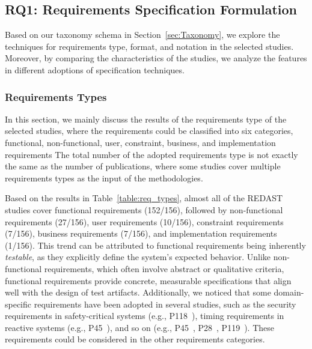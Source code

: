 \subsection{RQ1: Requirements Specification Formulation}
\label{sec:RQ1}
Based on our taxonomy schema in Section~\ref{sec:Taxonomy}, we explore the techniques for requirements type, format, and notation in the selected studies. Moreover, by comparing the characteristics of the studies, we analyze the features in different adoptions of specification techniques.

\subsubsection{Requirements Types}





In this section, we mainly discuss the results of the requirements type of the selected studies, where the requirements could be classified into six categories, functional, non-functional, user, constraint, business, and implementation requirements The total number of the adopted requirements type is not exactly the same as the number of publications, where some studies cover multiple requirements types as the input of the methodologies.

Based on the results in Table~\ref{table:req_types}, almost all of the REDAST studies cover functional requirements (152/156), followed by non-functional requirements (27/156), user requirements (10/156), constraint requirements (7/156), business requirements (7/156), and implementation requirements (1/156). This trend can be attributed to functional requirements being inherently \emph{testable}, as they explicitly define the system's expected behavior. Unlike non-functional requirements, which often involve abstract or qualitative criteria, functional requirements provide concrete, measurable specifications that align well with the design of test artifacts. Additionally, we noticed that some domain-specific requirements have been adopted in several studies, such as the security requirements in safety-critical systems (e.g., P118~), timing requirements in reactive systems (e.g., P45~), and so on (e.g., P45~, P28~, P119~). These requirements could be considered in the other requirements categories.

